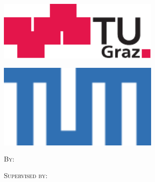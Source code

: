 
\begin{titlepage}
    \begin{center}
        \begin{minipage}{0.49\textwidth}
            \centering
            \includegraphics[width=0.6\textwidth]{styles/tu_graz_log.pdf}
        \end{minipage}
        \hfill
        \begin{minipage}{0.49\textwidth}
            \centering
            \includegraphics[width=0.6\textwidth]{styles/tu_munich_logo_blue.png}
        \end{minipage}


        \vspace{5cm}

        {\LARGE \textbf{\mytitle}}

        \vspace{0.5cm}
        {\Large \mysubtitle}

        \vspace{2cm}
        \textsc{By:\\ \myauthors}

        \vspace{2cm}
        \textsc{Supervised by:\\
            \mysupervisors
        }

        \vfill
        \textsc{\mydate}
    \end{center}
\end{titlepage}
